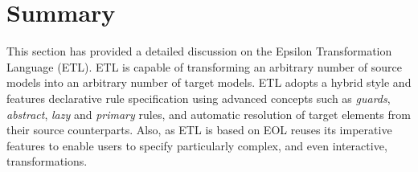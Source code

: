\section{Summary}

This section has provided a detailed discussion on the Epsilon Transformation Language (ETL). ETL is capable of transforming an arbitrary number of source models into an arbitrary number of target models. ETL adopts a hybrid style and features declarative rule specification using advanced concepts such as \emph{guards}, \emph{abstract}, \emph{lazy} and \emph{primary} rules, and automatic resolution of target elements from their source counterparts. Also, as ETL is based on EOL reuses its imperative features to enable users to specify particularly complex, and even interactive, transformations.